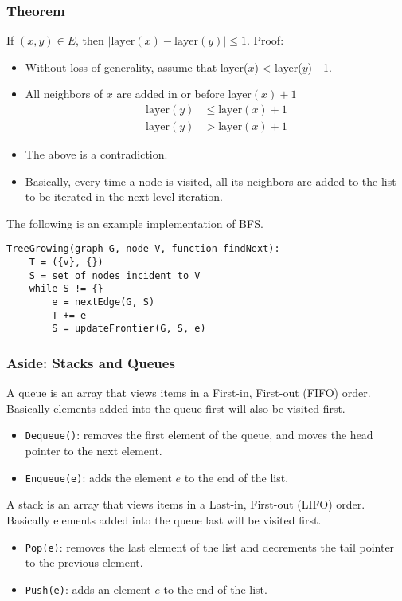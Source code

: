 \documentclass[10pt]{article}
\begin{document}
\subsubsection*{Theorem}
If $(x, y) \in E$, then $|\text{layer}(x) - \text{layer}(y)| \leq 1$. Proof:
\begin{itemize}
	\item Without loss of generality, assume that layer($x$) < layer($y$) - 1.  
	\item All neighbors of $x$ are added in or before layer$(x) + 1$
	\begin{align*}
        \text{layer}(y) &\leq \text{layer}(x) + 1 \\
        \text{layer}(y) &> \text{layer}(x) + 1
    \end{align*}
    \item The above is a contradiction.
    \item Basically, every time a node is visited, all its neighbors are added to the list to be iterated in the next level iteration.
\end{itemize}

The following is an example implementation of BFS.
\begin{verbatim}
TreeGrowing(graph G, node V, function findNext):
    T = ({v}, {})
    S = set of nodes incident to V
    while S != {}
        e = nextEdge(G, S)
        T += e
        S = updateFrontier(G, S, e)
\end{verbatim}

\subsubsection*{Aside: Stacks and Queues}
A queue is an array that views items in a First-in, First-out (FIFO) order.  Basically elements added into the queue first will also be visited first.
\begin{itemize}
	\item \texttt{Dequeue()}: removes the first element of the queue, and moves the head pointer to the next element.
	\item \texttt{Enqueue(e)}: adds the element $e$ to the end of the list.
\end{itemize}
A stack is an array that views items in a Last-in, First-out (LIFO) order.  Basically elements added into the queue last will be visited first.
\begin{itemize}
	\item \texttt{Pop(e)}: removes the last element of the list and decrements the tail pointer to the previous element.
    \item \texttt{Push(e)}: adds an element $e$ to the end of the list.
\end{itemize}
\end{document}
